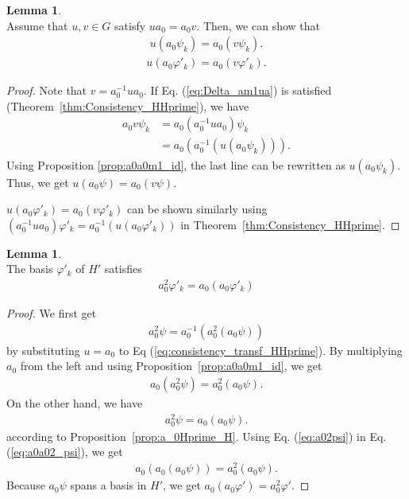 \documentclass{article}
\theoremstyle{definition}
\newtheorem{lem}[dfn]{Lemma}
\begin{document}
\begin{lem}\label{lem:uv_psi}~\\
  Assume that $u,v \in G$ satisfy $u a_0 = a_0 v$. Then, we can show that
  \begin{align}
    u (a_0 \psi_k) = a_0 (v \psi_k).
  \end{align}
  \begin{align}
    u (a_0 \varphi'_k) = a_0 (v \varphi'_k).
  \end{align}
\end{lem}

\begin{proof}
  Note that $v = a_0^{-1} u a_0$. If Eq. (\ref{eq:Delta_am1ua}) is satisfied (Theorem~\ref{thm:Consistency_HHprime}), we have
  \begin{align}
    a_0 v \psi_k 
    &= 
    a_0 (a_0^{-1} u a_0)\psi_k
    \nonumber
    \\&=
    a_0 (a_0^{-1} (u (a_0\psi_k))).
  \end{align}
  Using Proposition \ref{prop:a0a0m1_id}, the last line can be rewritten as $u (a_0\psi_k)$. Thus, we get $u (a_0 \psi) = a_0 (v \psi)$.
  
  $u (a_0 \varphi'_k) = a_0 (v \varphi'_k)$ can be shown similarly using $(a_0^{-1} u a_0)\varphi'_k = a_0^{-1} (u (a_0\varphi'_k))$ in Theorem~\ref{thm:Consistency_HHprime}.
\end{proof}
 
\begin{lem}~\\
  The basis  $\varphi'_k$ of $H'$ satisfies
  \begin{align}
    a_0^2 \varphi'_k = a_0 (a_0 \varphi'_k)
  \end{align}
\end{lem}

\begin{proof}
  We first get 
  \begin{align}
    a_0^2 \psi = a_0^{-1} (a_0^2 (a_0 \psi))
  \end{align} 
  by substituting $u=a_0$ to Eq (\ref{eq:consistency_transf_HHprime}). 
  By multiplying $a_0$ from the left and using Proposition~\ref{prop:a0a0m1_id}, we get
  \begin{align}
    a_0(a_0^2 \psi) =  a_0^2 (a_0 \psi).
    \label{eq:a0a02_psi}
  \end{align}
  On the other hand, we have 
  \begin{align}
    a_0^2 \psi = a_0 (a_0 \psi).
    \label{eq:a02psi}
  \end{align} 
  according to Proposition~\ref{prop:a_0Hprime_H}.
  Using Eq. (\ref{eq:a02psi}) in Eq. (\ref{eq:a0a02_psi}), we get 
  \begin{align}
    a_0(a_0(a_0 \psi)) =  a_0^2 (a_0 \psi).
  \end{align}
  Because $a_0 \psi$ spans a basis in $H'$, we get $a_0(a_0 \varphi') =  a_0^2 \varphi'$.
\end{proof}





\end{document}
